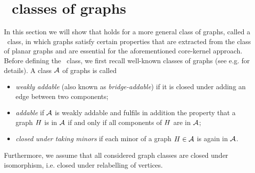 \section{\Pl\ classes of graphs}\label{CBsec:planar_like}
In this section we will show that  holds for a more general class of graphs, called a \pl\ class, in which graphs satisfy certain properties that are extracted from the class of planar graphs and are essential for the aforementioned core-kernel approach. Before defining the \pl\ class, we first recall well-known classes of graphs (see e.g. \cite{KangPanagiotou2013, McDiarmidStegerWelsh2005, McDiarmidStegerWelsh2006, BalisterBollobasGerke2008} for details). A class $\mathcal{A}$ of graphs is called
\begin{itemize}
 \item {\em weakly addable} (also known as {\em bridge-addable}) if it is closed under adding an edge between two components;
 \item {\em addable} if $\mathcal{A}$ is weakly addable and fulfils in addition the property that a graph $H$ is in $\mathcal{A}$ if and only if all components of $H$ are in $\mathcal{A}$;
 \item {\em closed under taking minors} if each minor of a graph $H \in \mathcal{A}$ is again in $\mathcal{A}$.
\end{itemize}
Furthermore, we assume that all considered graph classes are closed under isomorphism, i.e. closed under relabelling of vertices.

